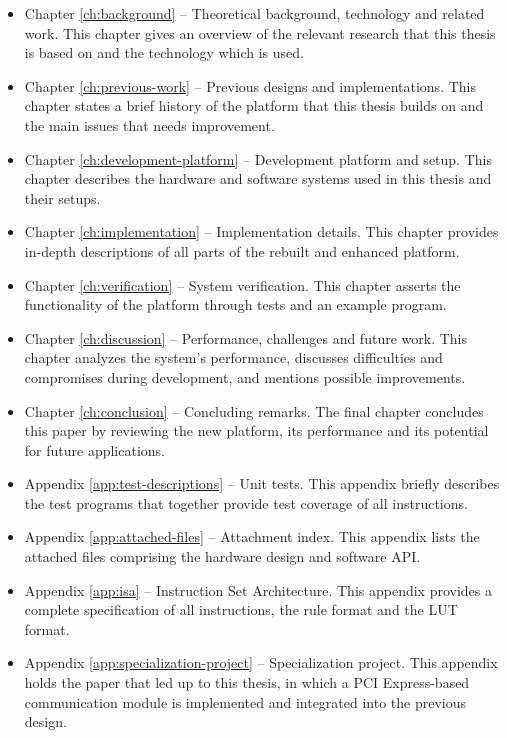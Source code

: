 \begin{itemize}
    \item Chapter \ref{ch:background} –
        Theoretical background, technology and related work.
        This chapter gives an overview of the relevant research that this thesis is based on and the technology which is used.
    \item Chapter \ref{ch:previous-work} –
        Previous designs and implementations.
        This chapter states a brief history of the platform that this thesis builds on and the main issues that needs improvement.
    \item Chapter \ref{ch:development-platform} –
        Development platform and setup.
        This chapter describes the hardware and software systems used in this thesis and their setups.
    \item Chapter \ref{ch:implementation} –
        Implementation details.
        This chapter provides in-depth descriptions of all parts of the rebuilt and enhanced platform.
    \item Chapter \ref{ch:verification} –
        System verification.
        This chapter asserts the functionality of the platform through tests and an example program.
    \item Chapter \ref{ch:discussion} –
        Performance, challenges and future work.
        This chapter analyzes the system's performance, discusses difficulties and compromises during development, and mentions possible improvements.
    \item Chapter \ref{ch:conclusion} –
        Concluding remarks.
        The final chapter concludes this paper by reviewing the new platform, its performance and its potential for future applications.
    \item Appendix \ref{app:test-descriptions} –
        Unit tests.
        This appendix briefly describes the test programs that together provide test coverage of all instructions.
    \item Appendix \ref{app:attached-files} –
        Attachment index.
        This appendix lists the attached files comprising the hardware design and software API.
    \item Appendix \ref{app:isa} –
        Instruction Set Architecture.
        This appendix provides a complete specification of all instructions, the rule format and the LUT format.
    \item Appendix \ref{app:specialization-project} –
        Specialization project.
        This appendix holds the paper that led up to this thesis, in which a PCI Express-based communication module is implemented and integrated into the previous design.
\end{itemize}
